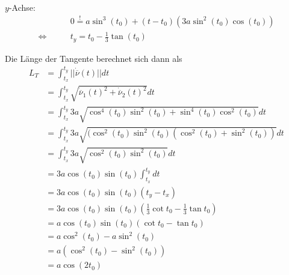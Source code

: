 \documentclass[a4paper,german,12pt,smallheadings]{scrartcl}
\begin{document}
$y$-Achse:
\begin{align*}
  &0 \overset{!}{=} a \sin^3(t_0) + (t-t_0)(3a \sin^2(t_0) \cos(t_0)) \\
  \Leftrightarrow\qquad &t_y = t_0 - \frac{1}{3} \tan(t_0)
\end{align*}

Die Länge der Tangente berechnet sich dann als
\begin{align*}
  L_T &= \int_{t_x}^{t_y} ||\dot{\overline{\nu}}(t)|| dt \\
      &= \int_{t_x}^{t_y} \sqrt{\dot{\overline{\nu}}_1(t)^2 + \dot{\overline{\nu}}_2(t)^2} dt \\
      &= \int_{t_x}^{t_y} 3a \sqrt{\cos^4(t_0)\sin^2(t_0) + \sin^4(t_0) \cos^2(t_0)} dt \\
      &= \int_{t_x}^{t_y} 3a \sqrt{(\cos^2(t_0)\sin^2(t_0) (\cos^2(t_0) + \sin^2(t_0))} dt \\
      &= \int_{t_x}^{t_y} 3a \sqrt{\cos^2(t_0)\sin^2(t_0)} dt \\
      &= 3a \cos(t_0)\sin(t_0) \int_{t_x}^{t_y} dt \\
      &= 3a \cos(t_0)\sin(t_0) (t_y - t_x) \\
      &= 3a \cos(t_0)\sin(t_0) (\frac{1}{3} \cot t_0 - \frac{1}{3} \tan t_0) \\
      &= a \cos(t_0) \sin(t_0) (\cot t_0 - \tan t_0) \\
      &= a \cos^2(t_0) - a \sin^2(t_0) \\
      &= a (\cos^2(t_0) - \sin^2(t_0)) \\
      &= a \cos(2 t_0)
\end{align*}
\end{document}

